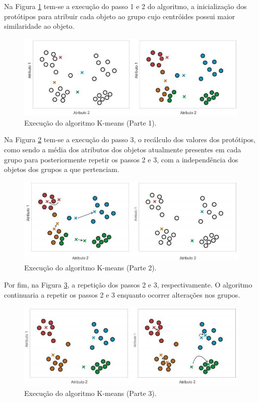\documentclass[
	12pt,				%
	a4paper,		%
	oneside,    %
	chapter=TITLE,		   %
	section=TITLE,		   %
	subsection=TITLE,	   %
	subsubsection=TITLE, %
	english,			%
	french,				%
	spanish,			%
	brazil,				%
]{abntex2}
\begin{document}
Na Figura \ref{fig:passo1} tem-se a execução do passo 1 e 2 do
algoritmo, a inicialização dos protótipos para atribuir cada objeto ao
grupo cujo centróides possui maior similaridade ao objeto.

\begin{figure}
\centering
\includegraphics{../fig/passo1.jpeg}
\caption{Execução do algoritmo K-means (Parte 1).\label{fig:passo1}}
\end{figure}

Na Figura \ref{fig:passo2} tem-se a execução do passo 3, o recálculo dos
valores dos protótipos, como sendo a média dos atributos dos objetos
atualmente presentes em cada grupo para posteriormente repetir os passos
2 e 3, com a independência dos objetos dos grupos a que pertenciam.

\begin{figure}
\centering
\includegraphics{../fig/passo2.jpeg}
\caption{Execução do algoritmo K-means (Parte 2).\label{fig:passo2}}
\end{figure}

Por fim, na Figura \ref{fig:passo3}, a repetição dos passos 2 e 3,
respectivamente. O algoritmo continuaria a repetir os passos 2 e 3
enquanto ocorrer alterações nos grupos.

\begin{figure}
\centering
\includegraphics{../fig/passo3.jpeg}
\caption{Execução do algoritmo K-means (Parte 3).\label{fig:passo3}}
\end{figure}
\end{document}

